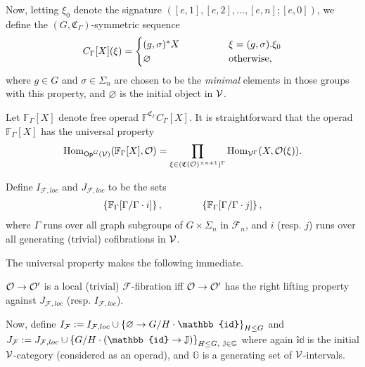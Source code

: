 \documentclass[a4paper,10pt
,draft
]{article}%
\renewcommand{\F}{\mathcal F}
\newcommand{\J}{\mathbb J}
\renewcommand{\1}{\ensuremath{\mathbb{id}}}
\begin{document}
Now, letting $\xi_0$ denote the signature $([e,1],[e,2],\dots,[e,n];[e,0])$,
we define the $(G,\mathfrak C_\Gamma)$-symmetric sequence
\begin{equation}
      C_\Gamma[X](\xi) =
      \begin{cases}
            (g,\sigma)^{\**} X \qquad \qquad & \xi = (g,\sigma).\xi_0
            \\
            \varnothing & \mbox{otherwise,}
      \end{cases}
\end{equation}
where $g \in G$ and $\sigma \in \Sigma_n$ are chosen to be the \textit{minimal} elements in those groups with this property,
and $\varnothing$ is the initial object in $\mathcal V$.

Let $\mathbb F_\Gamma[X]$ denote free operad $\mathbb F^{\mathfrak C_\Gamma} C_\Gamma[X]$.
It is straightforward that the operad $\mathbb F_\Gamma[X]$ has the universal property
\begin{equation}
      \operatorname{Hom}_{\mathsf{Op}^G(\mathcal V)}(\mathbb F_\Gamma[X], \mathcal{O}) = \mathop\prod\limits_{\xi \in (\mathfrak C(\mathcal{O})^{\times n+1})^\Gamma}\operatorname{Hom}_{\mathcal V^\Gamma}(X, \mathcal{O}(\xi)).
\end{equation}

Define $I_{\F,loc}$ and $J_{\F, loc}$ to be the sets
\begin{align*}
  \left\{\mathbb F_\Gamma[\Gamma/\Gamma \cdot i]\right\}, \qquad \qquad \left\{\mathbb F_\Gamma[\Gamma/\Gamma \cdot j]\right\},
\end{align*}
where $\Gamma$ runs over all graph subgroups of $G \times \Sigma_n$ in $\F_n$,
and $i$ (resp. $j$) runs over all generating (trivial) cofibrations in $\mathcal V$.

The universal property makes the following immediate.
\begin{corollary}
      $\mathcal{O} \to \mathcal{O}'$ is a local (trivial) $\F$-fibration iff
      $\mathcal{O} \to \mathcal{O}'$ has the right lifting property against $J_{\F, loc}$ (resp. $I_{\F, loc}$).
\end{corollary}

Now, define $I_{\F}:= I_{\F, loc} \mathbin{\cup} \set{\varnothing \to G/H \cdot \1}_{H\leq G}$
and
$J_{\F} := J_{\F, loc} \mathbin{\cup} \set{G/H \cdot (\1 \to \J)}_{H\leq G,\ \J\in\mathbb{G}}$
where again $\1$ is the initial $\mathcal V$-category (considered as an operad), and $\mathbb{G}$ is a generating set of $\mathcal V$-intervals. 
\end{document}
